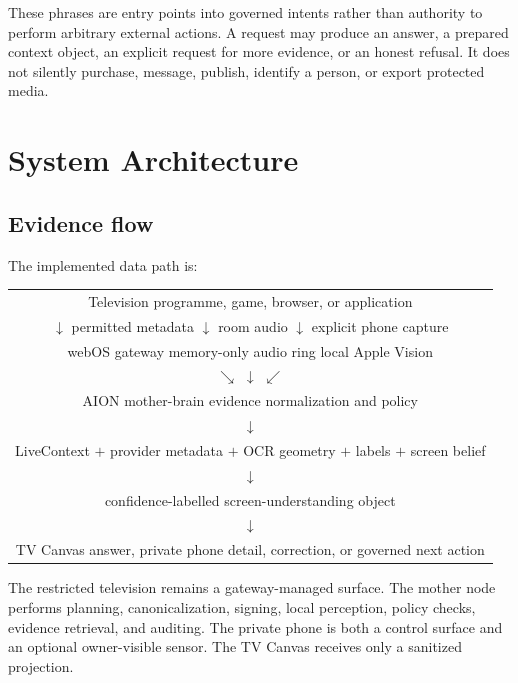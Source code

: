 \documentclass[11pt,a4paper]{article}
\begin{document}
These phrases are entry points into governed intents rather than authority to
perform arbitrary external actions.  A request may produce an answer, a
prepared context object, an explicit request for more evidence, or an honest
refusal.  It does not silently purchase, message, publish, identify a person,
or export protected media.

\section{System Architecture}

\subsection{Evidence flow}

The implemented data path is:

\begin{center}
\begin{tabular}{c}
Television programme, game, browser, or application\\
$\downarrow$ permitted metadata \hspace{12mm} $\downarrow$ room audio
\hspace{12mm} $\downarrow$ explicit phone capture\\
webOS gateway \hspace{9mm} memory-only audio ring
\hspace{9mm} local Apple Vision\\
$\searrow$ \hspace{27mm} $\downarrow$ \hspace{27mm} $\swarrow$\\
AION mother-brain evidence normalization and policy\\
$\downarrow$\\
LiveContext $+$ provider metadata $+$ OCR geometry $+$ labels $+$ screen belief\\
$\downarrow$\\
confidence-labelled screen-understanding object\\
$\downarrow$\\
TV Canvas answer, private phone detail, correction, or governed next action
\end{tabular}
\end{center}

The restricted television remains a gateway-managed surface.  The mother node
performs planning, canonicalization, signing, local perception, policy checks,
evidence retrieval, and auditing.  The private phone is both a control surface
and an optional owner-visible sensor.  The TV Canvas receives only a sanitized
projection.
\end{document}
